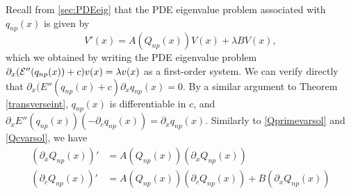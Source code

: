 \documentclass[thesis.tex]{subfiles}
\begin{document}
Recall from \cref{sec:PDEeig} that the PDE eigenvalue problem associated with $q_{np}(x)$ is given by 
\begin{equation}\label{PDEeig4}
V'(x) = A(Q_{np}(x))V(x) + \lambda B V(x),
\end{equation}
which we obtained by writing the PDE eigenvalue problem $\partial_x (\mathcal{E}''(q_{np}(x)) + c )v(x) = \lambda v(x)$ as a first-order system. We can verify directly that $\partial_x (E''(q_{np}(x) + c) \partial_x q_{np}(x) = 0$. By a similar argument to Theorem \ref{transverseint}, $q_{np}(x)$ is differentiable in $c$, and $\partial_x E''(q_{np}(x)) (-\partial_c q_{np}(x)) = \partial_x q_{np}(x)$. Similarly to \eqref{Qprimevarsol} and \eqref{Qcvarsol}, we have
\begin{equation}\label{Arelations}
\begin{aligned}
(\partial_x Q_{np}(x))' &= A(Q_{np}(x)) (\partial_x Q_{np}(x)) \\
(\partial_c Q_{np}(x))' &= A(Q_{np}(x)) (\partial_c Q_{np}(x)) + B (\partial_x Q_{np}(x)) 
\end{aligned}
\end{equation}
\end{document}
